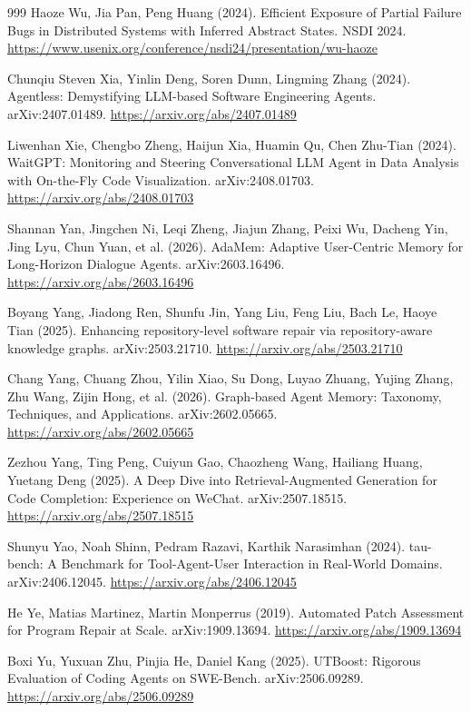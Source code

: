 \begin{thebibliography}{999}
 Haoze Wu, Jia Pan, Peng Huang (2024). Efficient Exposure of Partial Failure Bugs in Distributed Systems with Inferred Abstract States. NSDI 2024. \url{https://www.usenix.org/conference/nsdi24/presentation/wu-haoze}

 Chunqiu Steven Xia, Yinlin Deng, Soren Dunn, Lingming Zhang (2024). Agentless: Demystifying LLM-based Software Engineering Agents. arXiv:2407.01489. \url{https://arxiv.org/abs/2407.01489}

 Liwenhan Xie, Chengbo Zheng, Haijun Xia, Huamin Qu, Chen Zhu-Tian (2024). WaitGPT: Monitoring and Steering Conversational LLM Agent in Data Analysis with On-the-Fly Code Visualization. arXiv:2408.01703. \url{https://arxiv.org/abs/2408.01703}

 Shannan Yan, Jingchen Ni, Leqi Zheng, Jiajun Zhang, Peixi Wu, Dacheng Yin, Jing Lyu, Chun Yuan, et al. (2026). AdaMem: Adaptive User-Centric Memory for Long-Horizon Dialogue Agents. arXiv:2603.16496. \url{https://arxiv.org/abs/2603.16496}

 Boyang Yang, Jiadong Ren, Shunfu Jin, Yang Liu, Feng Liu, Bach Le, Haoye Tian (2025). Enhancing repository-level software repair via repository-aware knowledge graphs. arXiv:2503.21710. \url{https://arxiv.org/abs/2503.21710}

 Chang Yang, Chuang Zhou, Yilin Xiao, Su Dong, Luyao Zhuang, Yujing Zhang, Zhu Wang, Zijin Hong, et al. (2026). Graph-based Agent Memory: Taxonomy, Techniques, and Applications. arXiv:2602.05665. \url{https://arxiv.org/abs/2602.05665}

 Zezhou Yang, Ting Peng, Cuiyun Gao, Chaozheng Wang, Hailiang Huang, Yuetang Deng (2025). A Deep Dive into Retrieval-Augmented Generation for Code Completion: Experience on WeChat. arXiv:2507.18515. \url{https://arxiv.org/abs/2507.18515}

 Shunyu Yao, Noah Shinn, Pedram Razavi, Karthik Narasimhan (2024). tau-bench: A Benchmark for Tool-Agent-User Interaction in Real-World Domains. arXiv:2406.12045. \url{https://arxiv.org/abs/2406.12045}

 He Ye, Matias Martinez, Martin Monperrus (2019). Automated Patch Assessment for Program Repair at Scale. arXiv:1909.13694. \url{https://arxiv.org/abs/1909.13694}

 Boxi Yu, Yuxuan Zhu, Pinjia He, Daniel Kang (2025). UTBoost: Rigorous Evaluation of Coding Agents on SWE-Bench. arXiv:2506.09289. \url{https://arxiv.org/abs/2506.09289}


\end{thebibliography}
